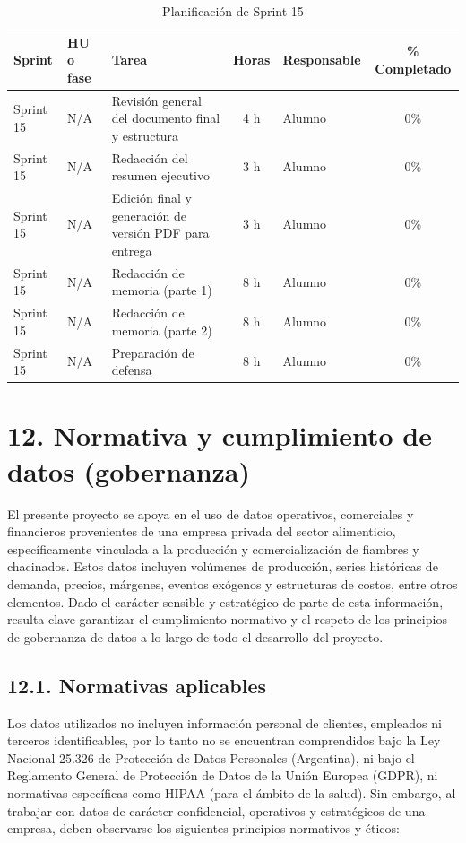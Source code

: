 \documentclass[
11pt, %
]{charter}
\begin{document}
\begin{table}[htpb]
\centering
\caption{Planificación de Sprint 15}
\begin{tabularx}{\linewidth}{@{}|l|l|X|c|l|c|@{}}
\hline
\rowcolor[HTML]{C0C0C0}
Sprint & HU o fase & Tarea & Horas & Responsable & \% Completado \\ \hline
Sprint 15 & N/A & Revisión general del documento final y estructura & 4 h & Alumno & 0\% \\ \hline
Sprint 15 & N/A & Redacción del resumen ejecutivo & 3 h & Alumno & 0\% \\ \hline
Sprint 15 & N/A & Edición final y generación de versión PDF para entrega & 3 h & Alumno & 0\% \\ \hline
Sprint 15 & N/A & Redacción de memoria (parte 1) & 8 h & Alumno & 0\% \\ \hline
Sprint 15 & N/A & Redacción de memoria (parte 2) & 8 h & Alumno & 0\% \\ \hline
Sprint 15 & N/A & Preparación de defensa & 8 h & Alumno & 0\% \\ \hline
\end{tabularx}
\end{table}


\section{12. Normativa y cumplimiento de datos (gobernanza)}

El presente proyecto se apoya en el uso de datos operativos, comerciales y financieros provenientes de una empresa privada del sector alimenticio, específicamente vinculada a la producción y comercialización de fiambres y chacinados. Estos datos incluyen volúmenes de producción, series históricas de demanda, precios, márgenes, eventos exógenos y estructuras de costos, entre otros elementos. Dado el carácter sensible y estratégico de parte de esta información, resulta clave garantizar el cumplimiento normativo y el respeto de los principios de gobernanza de datos a lo largo de todo el desarrollo del proyecto.

\subsection*{12.1. Normativas aplicables}

Los datos utilizados no incluyen información personal de clientes, empleados ni terceros identificables, por lo tanto no se encuentran comprendidos bajo la Ley Nacional 25.326 de Protección de Datos Personales (Argentina), ni bajo el Reglamento General de Protección de Datos de la Unión Europea (GDPR), ni normativas específicas como HIPAA (para el ámbito de la salud). Sin embargo, al trabajar con datos de carácter confidencial, operativos y estratégicos de una empresa, deben observarse los siguientes principios normativos y éticos:
\end{document}
